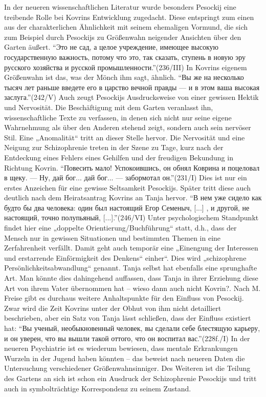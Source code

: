 \documentclass[12pt,headsepline,a4paper]{scrartcl}
\newcommand\textcyr[1]{{\fontencoding{OT2}\fontfamily{wncyr}\selectfont ``#1''}}
\begin{document}
In der neueren wissenschaftlichen Literatur wurde besonders Pesockij eine treibende Rolle bei
Kovrins Entwicklung zugedacht.\autocite{freise91} Diese entspringt zum einen aus der charakterlichen Ähnlichkeit
mit seinem ehemaligen Vormund, die sich zum Beispiel durch Pesockijs zu Größenwahn neigender
Ansichten über den Garten äußert. \textcyr{Это не сад, а целое учреждение, имеющее высокую
государственную важность, потому что это, так сказать, ступень в новую эру русского
хозяйства и русской промышленности.}(236/III) In Kovrins eigenem Größenwahn ist das, was
der Mönch ihm sagt, ähnlich. \textcyr{Вы же на несколько тысяч лет раньше введете его в царство
вечной правды — и в этом ваша высокая заслуга.}(242/V) Auch zeugt Pesockijs
Ausdrucksweise von einer gewissen Hektik und Nervosität.\autocite[93]{freise91} Die Beschäftigung mit dem Garten
veranlasst ihn, wissenschaftliche Texte zu verfassen, in denen sich nicht nur seine eigene
Wahrnehmung als über den Anderen stehend zeigt, sondern auch sein nervöser Stil. Eine
„Anomalität“ tritt an dieser Stelle hervor.\autocite[90]{freise91} Die Nervosität und eine Neigung zur Schizophrenie
treten in der Szene zu Tage, kurz nach der Entdeckung eines Fehlers eines Gehilfen und der
freudigen Bekundung in Richtung Kovrin. \textcyr{Повесить мало! Успокоившись, он обнял Коврина и
поцеловал в щеку. — Ну, дай бог... дай бог... — забормотал он.}(231/I) Dies ist nur ein erstes
Anzeichen für eine gewisse Seltsamkeit Pesockijs. Später tritt diese auch deutlich nach dem
Heiratsantrag Kovrins an Tanja hervor. \textcyr{В нем уже сидело как будто бы два человека: один был
настоящий Егор Семеныч, [...] , и другой, не настоящий, точно полупьяный, [...].}(246/VI)
Unter psychologischem Standpunkt findet hier eine 
„doppelte Orientierung/Buchführung“\autocite[61]{avenarius} statt,
d.h., dass der Mensch nur in gewissen Situationen und bestimmten Themen in eine Zerfahrenheit
verfällt. Damit geht auch temporär eine „Einengung der Interessen und erstarrende Einförmigkeit
des Denkens“ einher“\autocite[64]{avenarius}. Dies wird „schizophrene Persönlichkeitsabwandlung“ genannt. Tanja selbst
hat ebenfalls eine sprunghafte Art. Man könnte dies dahingehend auffassen, dass Tanja in ihrer
Erziehung diese Art von ihrem Vater übernommen hat -- wieso dann auch nicht Kovrin?. Nach M.
Freise gibt es durchaus weitere Anhaltspunkte für den Einfluss von Pesockij. Zwar wird die Zeit
Kovrins unter der Obhut von ihm nicht detailliert beschrieben, aber ein Satz von Tanja lässt
schließen, dass der Einfluss existiert hat: \textcyr{Вы ученый, необыкновенный человек, вы сделали
себе блестящую карьеру, и он уверен, что вы вышли такой оттого, что он воспитал
вас.}(228f./I) In der neueren Psychiatrie ist es wiederum bewiesen, dass mentale Erkrankungen
Wurzeln in der Jugend haben könnten -- das beweist nach neueren Daten die Untersuchung
verschiedener Größenwahnsinniger.\autocite[10]{avenarius} Des Weiteren ist die Teilung des Gartens an sich ist schon ein
Ausdruck der Schizophrenie Pesockijs und tritt auch in symbolträchtige Korrespondenz zu seinem
Zustand.\autocite{freise91}
\end{document}
